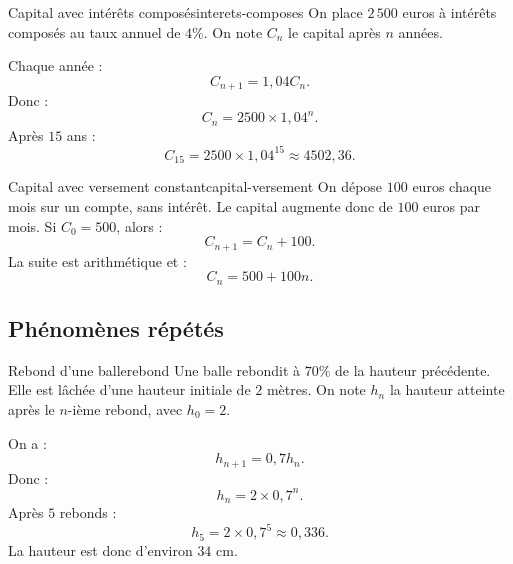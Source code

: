 \documentclass[11pt,a4paper]{article}
\begin{document}
\begin{examplebox}{Capital avec intérêts composés}{interets-composes}
On place $2\,500$ euros à intérêts composés au taux annuel de $4\%$. On note $C_n$ le capital après $n$ années.

Chaque année :
\[
C_{n+1}=1{,}04C_n.
\]
Donc :
\[
C_n=2500\times1{,}04^n.
\]
Après $15$ ans :
\[
C_{15}=2500\times1{,}04^{15}\approx4502{,}36.
\]
\end{examplebox}

\begin{examplebox}{Capital avec versement constant}{capital-versement}
On dépose $100$ euros chaque mois sur un compte, sans intérêt. Le capital augmente donc de $100$ euros par mois. Si $C_0=500$, alors :
\[
C_{n+1}=C_n+100.
\]
La suite est arithmétique et :
\[
C_n=500+100n.
\]
\end{examplebox}

\subsection{Phénomènes répétés}

\begin{examplebox}{Rebond d'une balle}{rebond}
Une balle rebondit à $70\%$ de la hauteur précédente. Elle est lâchée d'une hauteur initiale de $2$ mètres. On note $h_n$ la hauteur atteinte après le $n$-ième rebond, avec $h_0=2$.

On a :
\[
h_{n+1}=0{,}7h_n.
\]
Donc :
\[
h_n=2\times0{,}7^n.
\]
Après $5$ rebonds :
\[
h_5=2\times0{,}7^5\approx0{,}336.
\]
La hauteur est donc d'environ $34$ cm.
\end{examplebox}
\end{document}
